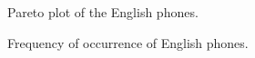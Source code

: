 \begin{figure}[h!]
\noindent{}
\caption{Pareto plot of the English phones.}
\label{fig:phones_pareto}
\end{figure} 





\begin{figure}[h!]
\noindent{}
\caption{Frequency of occurrence of English phones.}
\label{fig:phonesfrequencyocc_en}
\end{figure} 



